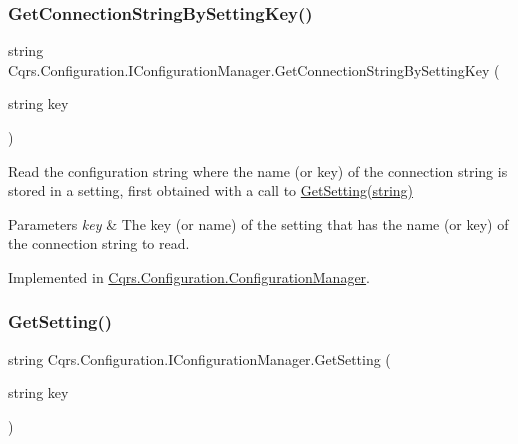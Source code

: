 \subsubsection{\texorpdfstring{Get\+Connection\+String\+By\+Setting\+Key()}{GetConnectionStringBySettingKey()}}
{\footnotesize\ttfamily string Cqrs.\+Configuration.\+I\+Configuration\+Manager.\+Get\+Connection\+String\+By\+Setting\+Key (\begin{DoxyParamCaption}\item[{string}]{key }\end{DoxyParamCaption})}



Read the configuration string where the name (or key) of the connection string is stored in a setting, first obtained with a call to \hyperlink{interfaceCqrs_1_1Configuration_1_1IConfigurationManager_a9f7b7d4d8c26a0589f01c8a7f69901ef_a9f7b7d4d8c26a0589f01c8a7f69901ef}{Get\+Setting(string)} 


\begin{DoxyParams}{Parameters}
{\em key} & The key (or name) of the setting that has the name (or key) of the connection string to read.\\
\hline
\end{DoxyParams}


Implemented in \hyperlink{classCqrs_1_1Configuration_1_1ConfigurationManager_accd6e8fbb5566f00d356c7fa6c6fdb98_accd6e8fbb5566f00d356c7fa6c6fdb98}{Cqrs.\+Configuration.\+Configuration\+Manager}.

\mbox{\label{interfaceCqrs_1_1Configuration_1_1IConfigurationManager_a9f7b7d4d8c26a0589f01c8a7f69901ef_a9f7b7d4d8c26a0589f01c8a7f69901ef}} 
\subsubsection{\texorpdfstring{Get\+Setting()}{GetSetting()}}
{\footnotesize\ttfamily string Cqrs.\+Configuration.\+I\+Configuration\+Manager.\+Get\+Setting (\begin{DoxyParamCaption}\item[{string}]{key }\end{DoxyParamCaption})}



